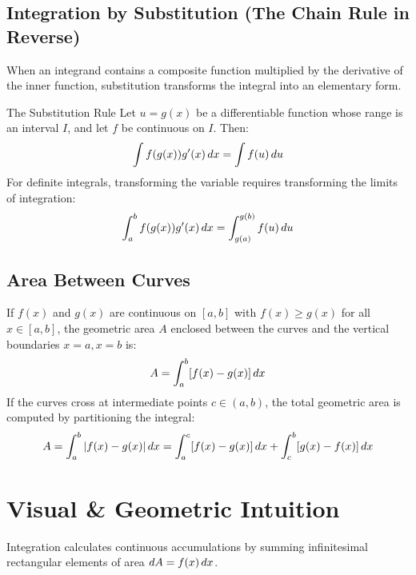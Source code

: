 \subsection{Integration by Substitution (The Chain Rule in Reverse)}

When an integrand contains a composite function multiplied by the derivative of the inner function, substitution transforms the integral into an elementary form.

\begin{theorembox}{The Substitution Rule}
Let $u = g(x)$ be a differentiable function whose range is an interval $I$, and let $f$ be continuous on $I$. Then:
\begin{equation}
\int f(g(x)) g'(x) \,dx = \int f(u) \, du
\end{equation}
For definite integrals, transforming the variable requires transforming the limits of integration:
\begin{equation}
\int_a^b f(g(x)) g'(x) \,dx = \int_{g(a)}^{g(b)} f(u) \, du
\end{equation}
\end{theorembox}

\subsection{Area Between Curves}

If $f(x)$ and $g(x)$ are continuous on $[a, b]$ with $f(x) \ge g(x)$ for all $x \in [a, b]$, the geometric area $A$ enclosed between the curves and the vertical boundaries $x = a, x = b$ is:
\begin{equation}
A = \int_a^b [f(x) - g(x)] \,dx
\end{equation}
If the curves cross at intermediate points $c \in (a, b)$, the total geometric area is computed by partitioning the integral:
\begin{equation}
A = \int_a^b |f(x) - g(x)| \,dx = \int_a^c [f(x) - g(x)] \,dx + \int_c^b [g(x) - f(x)] \,dx
\end{equation}

\section{Visual \& Geometric Intuition}

Integration calculates continuous accumulations by summing infinitesimal rectangular elements of area $dA = f(x) \,dx$.


